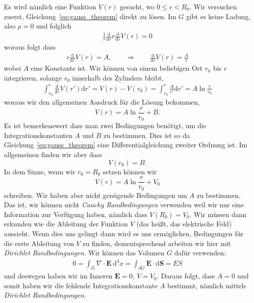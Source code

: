 \documentclass[A4paper, 12pt]{amsart}
\begin{document}
Es wird nämlich eine Funktion $ V(r) $ gesucht, wo
$ 0 \leq r < R_{0} $.
Wir versuchen zuerst, Gleichung~\ref{eq:gauss_theorem} direkt
zu lösen.
Im $ G $ gibt es keine Ladung, also $ \rho =0 $ und folglich %
\begin{align*}
  \frac{1}{r}
  \frac{\mathrm{d}}{\mathrm{d}r}
  r
  \frac{\mathrm{d}}{\mathrm{d}r}
  V(r)
  =0
\end{align*}
%
woraus folgt dass
\begin{align*}
  r
  \frac{\mathrm{d}}{\mathrm{d}r}
  V(r)
  = A,
  \qquad \Rightarrow \qquad
  \frac{\mathrm{d}}{\mathrm{d}r}
  V(r)
  =
  \frac{A}{r}
\end{align*}
wobei $ A $ eine Konstante ist.
Wir können von einem beliebigen Ort $ r_{0} $ bis $ r $ integrieren, solange
$ r_{0} $ innerhalb des Zylinders bleibt,
%
\begin{align*}
  \int_{r_{0}}^{r}
    \frac{\mathrm{d}}{\mathrm{d}r}
    V(r')
  \mathrm{d} r' =
  V(r) - V(r_{0}) =
  \int_{r_{0}}^{r}
    \frac{A}{r'}
  \mathrm{d} r' =
  A \ln \frac{r}{r_{0}}
\end{align*}
%
woraus wir den allgemeinen Ausdruck für die Lösung bekommen,
%
\begin{equation}
  V(r) =
  A \ln \frac{r}{r_{0}}
  +
  B
  .
\end{equation}
%
Es ist bemerkenswert dass man zwei Bedingungen benötigt, um die
Integrationskonstanten $ A $ und $ B $ zu bestimmen.
Dies ist so da
Gleichung~\ref{eq:gauss_theorem} eine Differentialgleichung zweiter Ordnung
ist. Im allgemeinen finden wir aber dass
%
\[
  V(r_{0}) = B.
\]
%
In dem Sinne, wenn wir
$ r_{0} = R_{0}$ setzen können wir
\begin{equation}
  V(r) =
  A \ln \frac{r}{r_{0}}
  +
  V_{0}
\end{equation}
schreiben.
Wir haben aber nicht genügende Bedingungen um $ A $ zu bestimmen.
Das ist, wir können nicht \textit{Cauchy Randbedingungen} verwenden
weil wir nur eine Information zur Verfügung haben, nämlich dass
$ V(R_{0}) = V_{0} $.
Wir müssen dann erkunden wie die Ableitung der Funktion $ V $ (das heißt,
das elektrische Feld) aussieht. Wenn dies uns gelingt dann wird es uns
ermöglichen, Bedingungen für die erste Ableitung von $ V $ zu finden,
dementsprechend arbeiten wir hier mit \textit{Dirichlet Randbedingungen}.
Wir können das Volumen $ G $ dafür verwenden:
%
\begin{align*}
  0
  =
  \int_{G}
    \nabla \cdot \mathbf{E}
  \ \mathrm{d}^{3} x
  =
  \int_{\partial G}
    \mathbf{E} \cdot \mathrm{d}\mathbf{S}
  =
  E S
\end{align*}
%
und deswegen haben wir im Inneren $ \mathbf{E} = 0 $, $ V = V_{0} $.
Daraus folgt, dass $ A = 0 $ und somit haben wir die fehlende
Integrationskonstante $ A $ bestimmt, nämlich mittels \textit{Dirichlet
Randbedingungen}.
\end{document}
